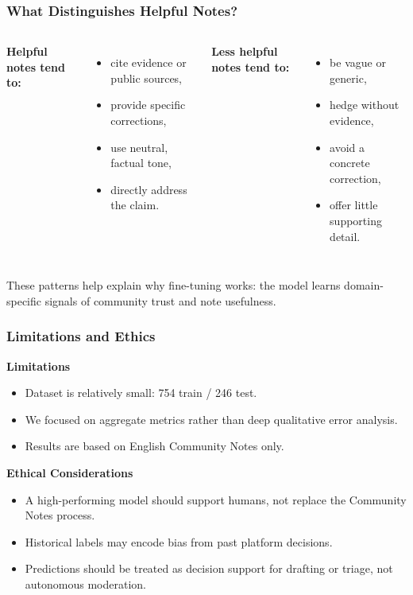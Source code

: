 \documentclass[11pt]{beamer}
\begin{document}
	\begin{frame}
		\frametitle{What Distinguishes Helpful Notes?}
		\begin{columns}[T]
			\textbf{Helpful notes tend to:}
			\begin{itemize}
				\item cite evidence or public sources,
				\item provide specific corrections,
				\item use neutral, factual tone,
				\item directly address the claim.
			\end{itemize}
			
			\textbf{Less helpful notes tend to:}
			\begin{itemize}
				\item be vague or generic,
				\item hedge without evidence,
				\item avoid a concrete correction,
				\item offer little supporting detail.
			\end{itemize}
		\end{columns}
		
		\vspace{0.4cm}
		These patterns help explain why fine-tuning works: the model learns domain-specific signals of community trust and note usefulness.
	\end{frame}
	
	\begin{frame}
		\frametitle{Limitations and Ethics}
		\textbf{Limitations}
		\begin{itemize}
			\item Dataset is relatively small: 754 train / 246 test.
			\item We focused on aggregate metrics rather than deep qualitative error analysis.
			\item Results are based on English Community Notes only.
		\end{itemize}
		
		\vspace{0.2cm}
		\textbf{Ethical Considerations}
		\begin{itemize}
			\item A high-performing model should support humans, not replace the Community Notes process.
			\item Historical labels may encode bias from past platform decisions.
			\item Predictions should be treated as decision support for drafting or triage, not autonomous moderation.
		\end{itemize}
	\end{frame}
	
\end{document}
